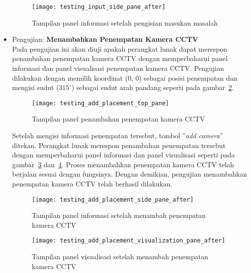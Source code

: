 \begin{itemize}
	\begin{figure}[H]
		\centering  
		\texttt{[image: testing\_input\_side\_pane\_after]}
		\caption[Tampilan panel informasi setelah pengisian masukan masalah]{Tampilan panel informasi setelah pengisian masukan masalah}
		\label{fig:testing_input_side_pane_after}
	\end{figure}
	
	\item Pengujian: \textbf{Menambahkan Penempatan Kamera CCTV}\\
	Pada pengujian ini akan diuji apakah perangkat lunak dapat merespon penambahan penempatan kamera CCTV dengan memperbaharui panel informasi dan panel visualisasi penempatan kamera CCTV. Pengujian dilakukan dengan memilih koordinat (0, 0) sebagai posisi penempatan dan mengisi sudut (\(315^\circ\)) sebagai sudut arah pandang seperti pada gambar~\ref{fig:testing_add_placement_top_pane}.
	
	\begin{figure}[H]
		\centering  
		\texttt{[image: testing\_add\_placement\_top\_pane]}
		\caption[Tampilan panel penambahan penempatan kamera CCTV]{Tampilan panel penambahan penempatan kamera CCTV}
		\label{fig:testing_add_placement_top_pane}
	\end{figure}
	
	 Setelah mengisi informasi penempatan tersebut, tombol ''\textit{add camera}'' ditekan. Perangkat lunak merespon penambahan penempatan tersebut dengan memperbaharui panel informasi dan panel visualisasi seperti pada gambar~\ref{fig:testing_add_placement_side_pane_after} dan~\ref{fig:testing_add_placement_visualization_pane_after}. Proses menambahkan penempatan kamera CCTV telah berjalan sesuai dengan fungsinya. Dengan demikian, pengujian menambahkan penempatan kamera CCTV telah berhasil dilakukan.
	 
	 \begin{figure}[H]
		\centering  
		\texttt{[image: testing\_add\_placement\_side\_pane\_after]}
		\caption[Tampilan panel informasi setelah menambah penempatan kamera CCTV]{Tampilan panel informasi setelah menambah penempatan kamera CCTV}
		\label{fig:testing_add_placement_side_pane_after}
	\end{figure}
	
	\begin{figure}[H]
		\centering  
		\texttt{[image: testing\_add\_placement\_visualization\_pane\_after]}
		\caption[Tampilan panel visualisasi setelah menambah penempatan kamera CCTV]{Tampilan panel visualisasi setelah menambah penempatan kamera CCTV}
		\label{fig:testing_add_placement_visualization_pane_after}
	\end{figure}
	

\end{itemize}

